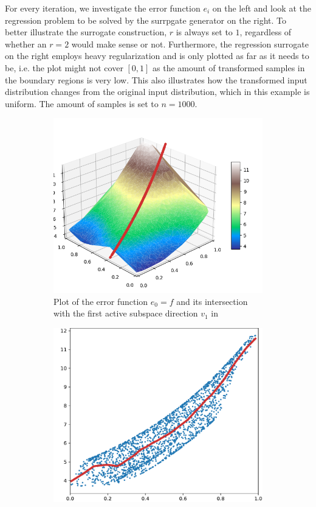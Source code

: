 \documentclass[
  a4paper,  %
  twoside,  %
  bibliography=totoc,
  headsepline,
  cleardoublepage=empty,
  parskip=half,
  draft=false
]{scrbook}
\begin{document}
For every iteration, we investigate the error function $e_i$ on the left and look at the regression problem to be solved by the surrpgate generator on the right.
To better illustrate the surrogate construction, $r$ is always set to $1$, regardless of whether an $r=2$ would make sense or not.
Furthermore, the regression surrogate on the right employs heavy regularization and is only plotted as far as it needs to be, i.e. the plot might not cover $[0,1]$ as the amount of transformed samples in the boundary regions is very low.
This also illustrates how the transformed input distribution changes from the original input distribution, which in this example is uniform.
The amount of samples is set to $n=1000$.

\newpage
\begin{mdframed}[style=style]
\begin{figure}[H]
\begin{subfigure}{.5\textwidth}
  \centering
  \includegraphics[width=.85\linewidth]{graphics/pipeline_current_1.png}
  \caption{Plot of the error function $e_0=f$ and its intersection with the first active subspace direction $v_1$ in \reddot}
\label{fig:pipeline_current_1}
\end{subfigure}%
\begin{subfigure}{.5\textwidth}
  \centering
  \includegraphics[width=.85\linewidth]{graphics/pipeline_local_1}

\end{subfigure}
\end{figure}
\end{mdframed}
\end{document}
